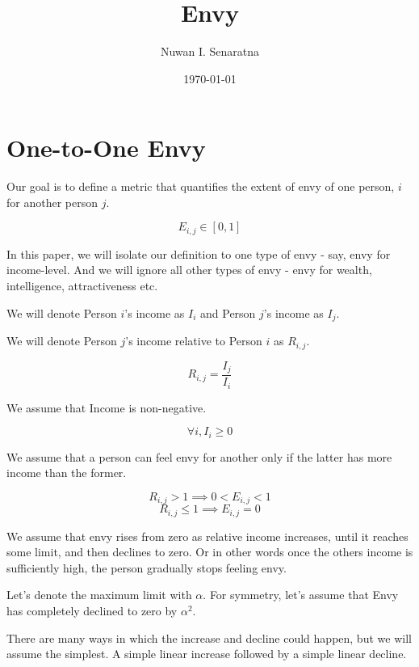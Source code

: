 \documentclass[AEJ]{AEA}
\title{Envy}
\author{Nuwan I. Senaratna}
\date{\today}
\begin{document}
\maketitle

\section{One-to-One Envy}
Our goal is to define a metric that quantifies the extent of envy of one person, $i$ for another person $j$. 

\begin{equation}
E_{i,j} \in [0,1]
\end{equation}

In this paper, we will isolate our definition to one type of envy - say, envy for income-level. And we will ignore all other types of envy - envy for wealth, intelligence, attractiveness etc.

We will denote Person $i$'s income as $I_i$ and Person $j$'s income as $I_j$. 

We will denote Person $j$'s income relative to Person $i$ as $R_{i,j}$.

\begin{equation}
    R_{i,j} = \frac{I_j}{I_i}
\end{equation}

We assume that Income is non-negative. 
    
\begin{equation}
    \forall i, I_i \ge 0
\end{equation}
    
We assume that a person can feel envy for another only if the latter has more income than  the former. 

\begin{equation}
    R_{i,j} > 1 \implies 0 < E_{i,j} < 1
\end{equation}
\begin{equation}
    R_{i,j} \le 1 \implies E_{i,j} = 0 
\end{equation}
 
We assume that envy rises from zero as relative income increases, until it reaches some limit, and then declines to zero. Or in other words once the others income is sufficiently high, the person gradually stops feeling envy. 

Let's denote the maximum limit with $\alpha$. For symmetry, let's assume that Envy has completely declined to zero by $\alpha^2$.

There are many ways in which the increase and decline could happen, but we will assume the simplest. A simple linear increase followed by a simple linear decline. 
\end{document}
